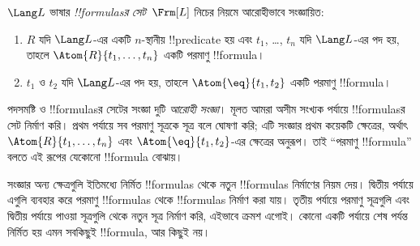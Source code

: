 \documentclass[../../../include/open-logic-section]{subfiles}
\begin{document}
\begin{defn}[সূত্র]
$\Lang L$ ভাষার \emph{!!{formula}sর সেট}~$\Frm[L]$ নিচের নিয়মে
আরোহীভাবে সংজ্ঞায়িত:
\begin{enumerate}


\item $R$ যদি $\Lang L$-এর একটি $n$-স্থানীয় !!{predicate} হয় এবং
  $t_1$, \dots, $t_n$ যদি $\Lang L$-এর পদ হয়, তাহলে
  $\Atom{R}{t_1,\ldots, t_n}$ একটি পরমাণু !!{formula}।

\item $t_1$ ও $t_2$ যদি $\Lang L$-এর পদ হয়, তাহলে
  $\Atom{\eq}{t_1, t_2}$ একটি পরমাণু !!{formula}।








\end{enumerate}
\end{defn}

\begin{explain}
পদসমষ্টি ও !!{formula}sর সেটের সংজ্ঞা দুটি \emph{আরোহী সংজ্ঞা}।
মূলত আমরা অসীম সংখ্যক পর্যায়ে !!{formula}sর সেট নির্মাণ করি। প্রথম
পর্যায়ে সব পরমাণু সূত্রকে সূত্র বলে ঘোষণা করি; এটি সংজ্ঞার প্রথম কয়েকটি
ক্ষেত্রের, অর্থাৎ
%
%
$\Atom{R}{t_1,\dots,t_n}$ এবং $\Atom{\eq}{t_1,t_2}$-এর ক্ষেত্রের
অনুরূপ। তাই “পরমাণু !!{formula}” বলতে এই রূপের যেকোনো !!{formula}
বোঝায়।

সংজ্ঞার অন্য ক্ষেত্রগুলি ইতিমধ্যে নির্মিত !!{formula}s থেকে নতুন
!!{formula}s নির্মাণের নিয়ম দেয়। দ্বিতীয় পর্যায়ে এগুলি ব্যবহার করে
পরমাণু !!{formula}s থেকে !!{formula}s নির্মাণ করা যায়। তৃতীয় পর্যায়ে
পরমাণু সূত্রগুলি এবং দ্বিতীয় পর্যায়ে পাওয়া সূত্রগুলি থেকে নতুন সূত্র
নির্মাণ করি, এইভাবে ক্রমশ এগোই। কোনো একটি পর্যায়ে শেষ পর্যন্ত নির্মিত
হয় এমন সবকিছুই !!{formula}, আর কিছুই নয়।
\end{explain}
\end{document}
